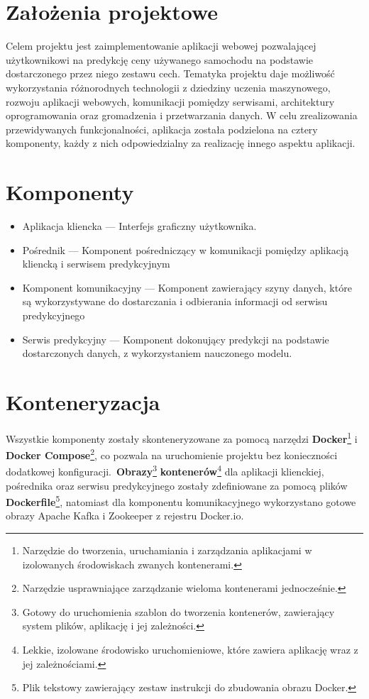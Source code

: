 \documentclass[12pt, a4paper]{report}
\begin{document}
\section{Założenia projektowe}
Celem projektu jest zaimplementowanie aplikacji webowej pozwalającej użytkownikowi na predykcję 
ceny używanego samochodu na podstawie dostarczonego przez niego zestawu cech. Tematyka projektu
daje możliwość wykorzystania różnorodnych technologii z dziedziny uczenia maszynowego, rozwoju
aplikacji webowych, komunikacji pomiędzy serwisami, architektury oprogramowania oraz gromadzenia i 
przetwarzania danych. W celu zrealizowania przewidywanych funkcjonalności, aplikacja została
podzielona na cztery komponenty, każdy z nich odpowiedzialny za realizację innego aspektu
aplikacji.
\section{Komponenty}
\begin{itemize}
    \item Aplikacja kliencka --- Interfejs graficzny użytkownika.
    \item Pośrednik --- Komponent pośredniczący w komunikacji pomiędzy aplikacją kliencką i serwisem predykcyjnym
    \item Komponent komunikacyjny --- Komponent zawierający szyny danych, które są wykorzystywane do dostarczania i odbierania informacji od serwisu predykcyjnego
    \item Serwis predykcyjny --- Komponent dokonujący predykcji na podstawie dostarczonych danych, z wykorzystaniem nauczonego modelu.
\end{itemize}

\section{Konteneryzacja}
Wszystkie komponenty zostały skonteneryzowane za pomocą narzędzi
\textbf{Docker}\footnote{Narzędzie do tworzenia, uruchamiania i zarządzania aplikacjami w izolowanych środowiskach zwanych kontenerami.}
i \textbf{Docker Compose}\footnote{Narzędzie usprawniające zarządzanie wieloma kontenerami jednocześnie.}, co pozwala na uruchomienie projektu
bez konieczności dodatkowej konfiguracji.\ \textbf{Obrazy}\footnote{Gotowy do uruchomienia szablon do tworzenia kontenerów, zawierający system plików, aplikację i jej zależności.}
\textbf{kontenerów}\footnote{Lekkie, izolowane środowisko uruchomieniowe, które zawiera aplikację wraz z jej zależnościami.}
dla aplikacji klienckiej, pośrednika oraz serwisu predykcyjnego zostały zdefiniowane za pomocą
plików \textbf{Dockerfile}\footnote{Plik tekstowy zawierający zestaw instrukcji do zbudowania obrazu Docker.},
natomiast dla komponentu komunikacyjnego wykorzystano gotowe obrazy Apache Kafka i Zookeeper z rejestru Docker.io.
\end{document}
